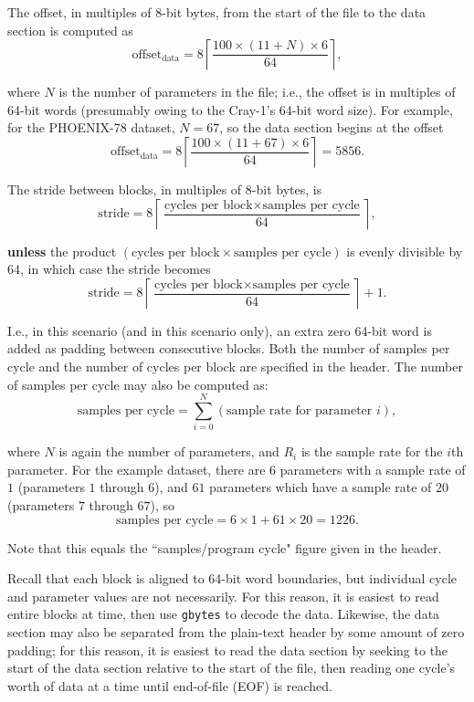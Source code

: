 \documentclass{report}
\begin{document}
The offset, in multiples of 8-bit bytes, from the start of the file to the data section is computed as
\[
	\text{offset}_\text{data} = 8 \left \lceil \dfrac{100\times(11+N)\times6}{64} \right \rceil \mathrm{,}
\]

\noindent where \(N\) is the number of parameters in the file; i.e., the offset is in multiples of 64-bit words (presumably owing to the Cray-1's 64-bit word size). For example, for the PHOENIX-78 dataset, \(N = 67\), so the data section begins at the offset
\[
	\text{offset}_\text{data} = 8 \left \lceil \dfrac{100\times(11+67)\times 6}{64} \right \rceil = 5856 \mathrm{.}
\]

The stride between blocks, in multiples of 8-bit bytes, is
\[
	\text{stride} = 8 \left \lceil \dfrac{\text{cycles per block} \times \text{samples per cycle}}{64} \right \rceil \mathrm{,}
\]

\noindent \textbf{unless} the product \((\text{cycles per block} \times \text{samples per cycle})\) is evenly divisible by \(64\), in which case the stride becomes
\[
	\text{stride} = 8 \left \lceil \dfrac{\text{cycles per block} \times \text{samples per cycle}}{64} \right \rceil + 1 \mathrm{.}
\]

\noindent I.e., in this scenario (and in this scenario only), an extra zero 64-bit word is added as padding between consecutive blocks. Both the number of samples per cycle and the number of cycles per block are specified in the header. The number of samples per cycle may also be computed as:
\[
	\text{samples per cycle} = \sum_{i=0}^{N} (\text{sample rate for parameter }i) \mathrm{,}
\]

\noindent where \(N\) is again the number of parameters, and \(R_i\) is the sample rate for the \(i\)th parameter. For the example dataset, there are \(6\) parameters with a sample rate of \(1\) (parameters \(1\) through \(6\)), and \(61\) parameters which have a sample rate of \(20\) (parameters \(7\) through \(67\)), so
\[
	\text{samples per cycle} = 6 \times 1 + 61 \times 20 = 1226 \mathrm{.}
\]

\noindent Note that this equals the ``samples/program cycle" figure given in the header.

Recall that each block is aligned to 64-bit word boundaries, but individual cycle and parameter values are not necessarily. For this reason, it is easiest to read entire blocks at time, then use \texttt{gbytes} to decode the data. Likewise, the data section may also be separated from the plain-text header by some amount of zero padding; for this reason, it is easiest to read the data section by seeking to the start of the data section relative to the start of the file, then reading one cycle's worth of data at a time until end-of-file (EOF) is reached.
\end{document}
